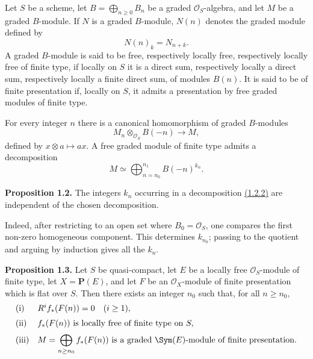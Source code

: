 Let \(S\) be a scheme, let \(B=\bigoplus_{n\geq 0}B_n\) be a graded \(\mathcal O_S\)-algebra, and let \(M\) be a graded \(B\)-module. If \(N\) is a graded \(B\)-module, \(N(n)\) denotes the graded module defined by
\[
  N(n)_k=N_{n+k}.
\]
A graded \(B\)-module is said to be free, respectively locally free, respectively locally free of finite type, if locally on \(S\) it is a direct sum, respectively locally a direct sum, respectively locally a finite direct sum, of modules \(B(n)\). It is said to be of finite presentation if, locally on \(S\), it admits a presentation by free graded modules of finite type.

For every integer \(n\) there is a canonical homomorphism of graded \(B\)-modules
\begin{equation}\tag{1.2.1}
  M_n\otimes_{\mathcal O_S}B(-n)\longrightarrow M,
\end{equation}
defined by \(x\otimes a\mapsto ax\). A free graded module of finite type admits a decomposition
\begin{equation}\tag{1.2.2}
  M\simeq \bigoplus_{n=n_0}^{n_1} B(-n)^{k_n}.
\end{equation}

\textbf{Proposition 1.2.} The integers \(k_n\) occurring in a decomposition \hyperlink{sga6.e06.eq.1-2-2}{(1.2.2)} are independent of the chosen decomposition.

Indeed, after restricting to an open set where \(B_0=\mathcal O_S\), one compares the first non-zero homogeneous component. This determines \(k_{n_0}\); passing to the quotient and arguing by induction gives all the \(k_n\).

\textbf{Proposition 1.3.} Let \(S\) be quasi-compact, let \(E\) be a locally free \(\mathcal O_S\)-module of finite type, let \(X=\mathbf P(E)\), and let \(F\) be an \(\mathcal O_X\)-module of finite presentation which is flat over \(S\). Then there exists an integer \(n_0\) such that, for all \(n\geq n_0\),
\[
\begin{array}{ll}
\text{\rm (i)}& R^i f_*(F(n))=0\quad (i\geq 1),\\[2mm]
\text{\rm (ii)}& f_*(F(n))\text{ is locally free of finite type on }S,\\[2mm]
\text{\rm (iii)}& \displaystyle M=\bigoplus_{n\geq n_0} f_*(F(n))
\text{ is a graded }\Sym(E)\text{-module of finite presentation.}
\end{array}
\]

